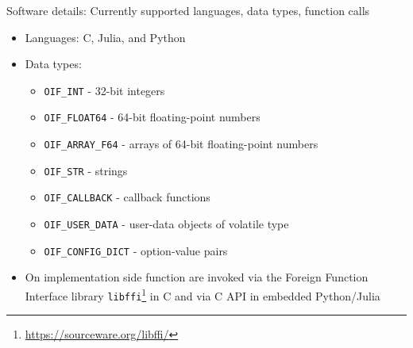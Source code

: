 \documentclass[10pt, aspectratio=169, progressbar=frametitle]{beamer}
\begin{document}
\begin{frame}{Software details: Currently supported languages, data types, function calls}
  \begin{itemize}
    \item Languages: C, Julia, and Python
    \item Data types:
          \begin{itemize}
            \item \texttt{OIF\_INT} - 32-bit integers
            \item \texttt{OIF\_FLOAT64} - 64-bit floating-point numbers
            \item \texttt{OIF\_ARRAY\_F64} - arrays of 64-bit floating-point numbers
            \item \texttt{OIF\_STR} - strings
            \item \texttt{OIF\_CALLBACK} - callback functions
            \item \texttt{OIF\_USER\_DATA} - user-data objects of volatile type
            \item \texttt{OIF\_CONFIG\_DICT} - option-value pairs
          \end{itemize}
    \item On implementation side function are invoked via
          the Foreign Function Interface library \texttt{libffi}\footnote{\url{https://sourceware.org/libffi/}}
          in C and via C API in embedded Python/Julia
  \end{itemize}
\end{frame}
\end{document}

